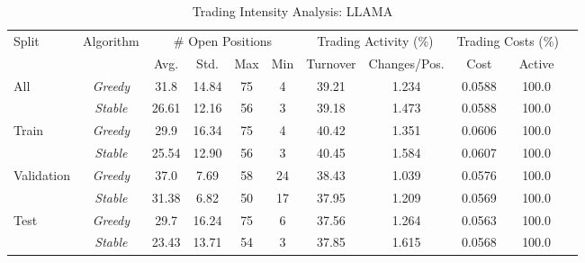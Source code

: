 
\begin{table}[htbp] 
\caption{Trading Intensity Analysis: LLAMA} 
\centering 
\label{tab:LLM_trading_intensity}
{\small
\begin{tabular}{lcccccccccc}
\toprule
Split & Algorithm & \multicolumn{4}{c}{\# Open Positions} & \multicolumn{2}{c}{Trading Activity (\%)} & \multicolumn{2}{c}{Trading Costs (\%)} \\
\cmidrule(lr{0.6em}){3-6} \cmidrule(lr{0.6em}){7-8} \cmidrule(lr{0.6em}){9-10}
& & Avg. & Std. & Max & Min & Turnover & Changes/Pos. & Cost & Active \\
\midrule
\multirow{2}{*}{All} & \textit{Greedy} & 31.8 & 14.84 & 75 & 4 & 39.21 & 1.234 & 0.0588 & 100.0 \\
 & \textit{Stable} & 26.61 & 12.16 & 56 & 3 & 39.18 & 1.473 & 0.0588 & 100.0 \\
\midrule
\multirow{2}{*}{Train} & \textit{Greedy} & 29.9 & 16.34 & 75 & 4 & 40.42 & 1.351 & 0.0606 & 100.0 \\
 & \textit{Stable} & 25.54 & 12.90 & 56 & 3 & 40.45 & 1.584 & 0.0607 & 100.0 \\
\midrule
\multirow{2}{*}{Validation} & \textit{Greedy} & 37.0 & 7.69 & 58 & 24 & 38.43 & 1.039 & 0.0576 & 100.0 \\
 & \textit{Stable} & 31.38 & 6.82 & 50 & 17 & 37.95 & 1.209 & 0.0569 & 100.0 \\
\midrule
\multirow{2}{*}{Test} & \textit{Greedy} & 29.7 & 16.24 & 75 & 6 & 37.56 & 1.264 & 0.0563 & 100.0 \\
 & \textit{Stable} & 23.43 & 13.71 & 54 & 3 & 37.85 & 1.615 & 0.0568 & 100.0 \\
\bottomrule
\end{tabular}
}


\end{table}
